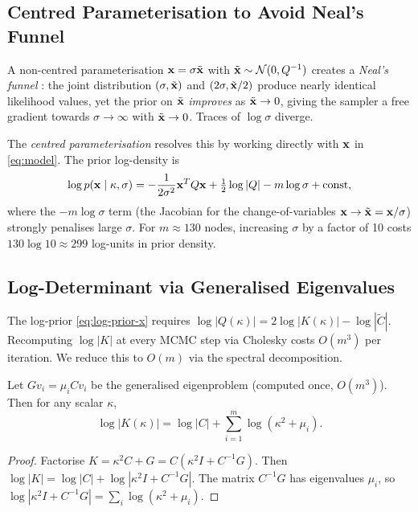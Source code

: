 \documentclass[11pt]{article}
\begin{document}
\subsection{Centred Parameterisation to Avoid Neal's Funnel}
\label{sec:centred}

A non-centred parameterisation $\mathbf{x} = \sigma \tilde{\mathbf{x}}$ with
$\tilde{\mathbf{x}} \sim \mathcal{N}(0, Q^{-1})$ creates a \emph{Neal's funnel}
\citep{neal2003slice}: the joint distribution
$({\sigma, \tilde{\mathbf{x}}})$ and $(2\sigma, \tilde{\mathbf{x}}/2)$ produce nearly identical
likelihood values, yet the prior on $\tilde{\mathbf{x}}$ \emph{improves} as
$\tilde{\mathbf{x}} \to 0$, giving the sampler a free gradient towards $\sigma \to \infty$
with $\tilde{\mathbf{x}} \to 0$.  Traces of $\log\sigma$ diverge.

The \emph{centred parameterisation} resolves this by working directly with
$\mathbf{x}$ in \eqref{eq:model}.  The prior log-density is
\begin{equation}
  \log p(\mathbf{x} \mid \kappa, \sigma) =
    -\frac{1}{2\sigma^2} \mathbf{x}^T Q \mathbf{x}
    + \tfrac{1}{2}\log|Q|
    - m \log\sigma
    + \text{const},
  \label{eq:log-prior-x}
\end{equation}
where the $-m\log\sigma$ term (the Jacobian for the change-of-variables
$\mathbf{x} \to \tilde{\mathbf{x}} = \mathbf{x}/\sigma$) strongly penalises large $\sigma$.
For $m \approx 130$ nodes, increasing $\sigma$ by a factor of 10 costs
$130 \log 10 \approx 299$ log-units in prior density.

\subsection{Log-Determinant via Generalised Eigenvalues}
\label{sec:logdet}

The log-prior \eqref{eq:log-prior-x} requires $\log|Q(\kappa)| = 2\log|K(\kappa)| - \log|\tilde{C}|$.
Recomputing $\log|K|$ at every MCMC step via Cholesky costs $O(m^3)$ per
iteration.  We reduce this to $O(m)$ via the spectral decomposition.

\begin{proposition}
Let $G v_i = \mu_i C v_i$ be the generalised eigenproblem (computed once,
$O(m^3)$).  Then for any scalar $\kappa$,
\begin{equation}
  \log|K(\kappa)| = \log|C| + \sum_{i=1}^m \log(\kappa^2 + \mu_i).
  \label{eq:logdet-trick}
\end{equation}
\end{proposition}

\begin{proof}
Factorise $K = \kappa^2 C + G = C(\kappa^2 I + C^{-1}G)$.  Then
$\log|K| = \log|C| + \log|\kappa^2 I + C^{-1}G|$.
The matrix $C^{-1}G$ has eigenvalues $\mu_i$, so
$\log|\kappa^2 I + C^{-1}G| = \sum_i \log(\kappa^2 + \mu_i)$.
\end{proof}
\end{document}
